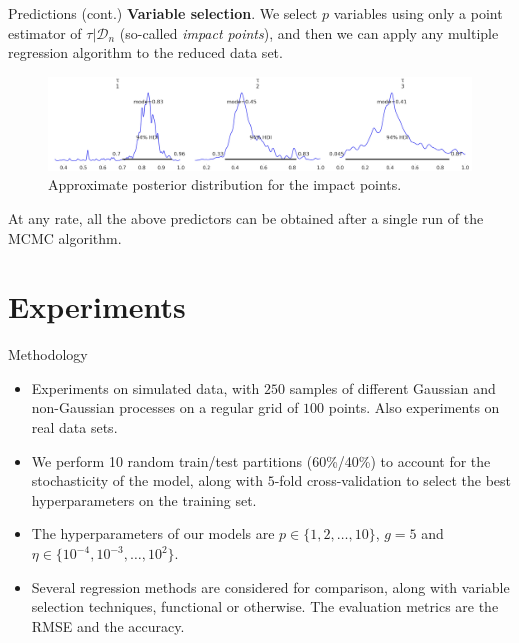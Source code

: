 \documentclass[9pt, english, professionalfonts]{beamer}
\begin{document}
\begin{frame}{Predictions (cont.)}
    \textbf{Variable selection}. We select \(p\) variables using only a point estimator of \(\tau|\mathcal D_n\) (so-called \textit{impact points}), and then we can apply any multiple regression algorithm to the reduced data set.
    \vspace{1em}

    \begin{figure}
      \includegraphics[width=\textwidth]{credible_intervals}
      \caption{Approximate posterior distribution for the impact points.}
    \end{figure}

    At any rate, all the above predictors can be obtained after a single run of the MCMC algorithm.
\end{frame}

\section{Experiments}

\begin{frame}{Methodology}
  \begin{itemize}
    \item Experiments on simulated data, with \(250\) samples of different Gaussian and non-Gaussian processes on a regular grid of \(100\) points. Also experiments on real data sets.
    \item We perform 10 random train/test partitions (60\%/40\%) to account for the stochasticity of the model, along with \(5\)-fold cross-validation to select the best hyperparameters on the training set.
    \item The hyperparameters of our models are \(p\in\{1,2,\dots,10\}\), \(g=5\) and \(\eta \in \{10^{-4}, 10^{-3}, \dots, 10^2\}\).
    \item Several regression methods are considered for comparison, along with variable selection techniques, functional or otherwise. The evaluation metrics are the RMSE and the accuracy.
  \end{itemize}
\end{frame}
\end{document}
